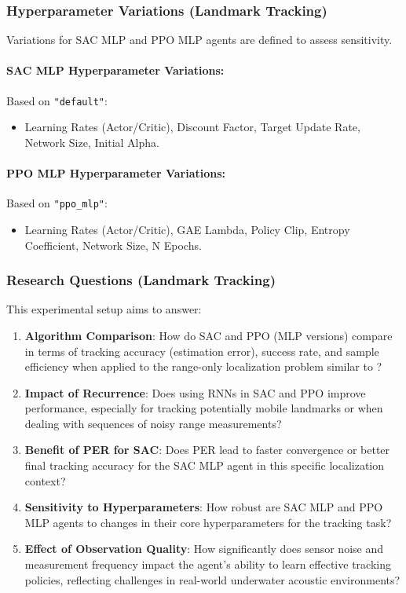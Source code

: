 \documentclass[11pt,a4paper]{article}
\newcommand{\code}[1]{\texttt{#1}} %
\begin{document}
\subsubsection{Hyperparameter Variations (Landmark Tracking)}
Variations for SAC MLP and PPO MLP agents are defined to assess sensitivity.

\paragraph{SAC MLP Hyperparameter Variations:} Based on \code{"default"}:
\begin{itemize}
    \item Learning Rates (Actor/Critic), Discount Factor, Target Update Rate, Network Size, Initial Alpha.
\end{itemize}

\paragraph{PPO MLP Hyperparameter Variations:} Based on \code{"ppo\_mlp"}:
\begin{itemize}
    \item Learning Rates (Actor/Critic), GAE Lambda, Policy Clip, Entropy Coefficient, Network Size, N Epochs.
\end{itemize}

\subsubsection{Research Questions (Landmark Tracking)}
This experimental setup aims to answer:
\begin{enumerate}
    \item \textbf{Algorithm Comparison}: How do SAC and PPO (MLP versions) compare in terms of tracking accuracy (estimation error), success rate, and sample efficiency when applied to the range-only localization problem similar to \cite{masmitja2023tracking}?
    \item \textbf{Impact of Recurrence}: Does using RNNs in SAC and PPO improve performance, especially for tracking potentially mobile landmarks or when dealing with sequences of noisy range measurements?
    \item \textbf{Benefit of PER for SAC}: Does PER lead to faster convergence or better final tracking accuracy for the SAC MLP agent in this specific localization context?
    \item \textbf{Sensitivity to Hyperparameters}: How robust are SAC MLP and PPO MLP agents to changes in their core hyperparameters for the tracking task?
    \item \textbf{Effect of Observation Quality}: How significantly does sensor noise and measurement frequency impact the agent's ability to learn effective tracking policies, reflecting challenges in real-world underwater acoustic environments?
\end{enumerate}
\end{document}
